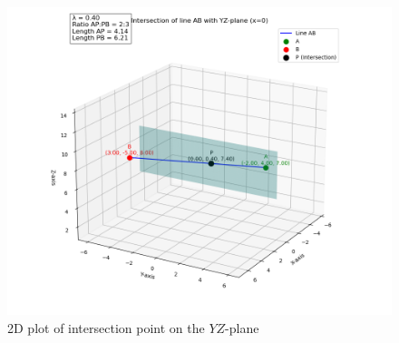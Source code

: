 \documentclass[journal]{IEEEtran}
\begin{document}
\begin{figure}[h]
    \centering
    \includegraphics[width=0.9\columnwidth]{figs/Fig -62.png}
    \caption{2D plot of intersection point on the $YZ$-plane}
    \label{fig:fig2}
\end{figure}
\end{document}
